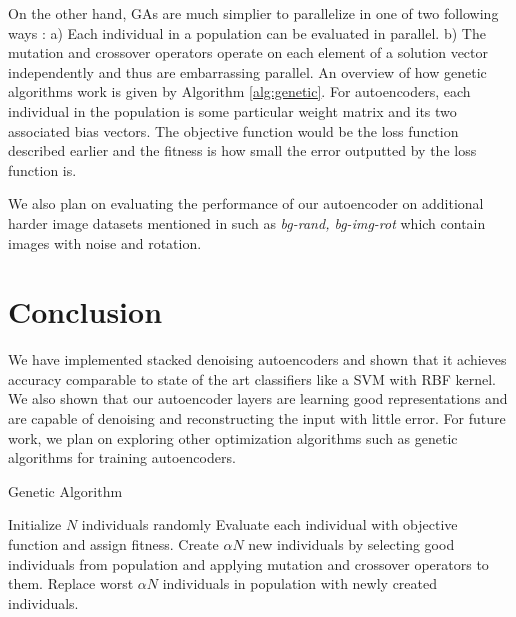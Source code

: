 \documentclass[conference]{IEEEtran}
\begin{document}
On the other hand, GAs are much simplier to parallelize in one of two following ways \cite{cantu1998survey}: a) Each individual in a population can be evaluated in parallel. b) The mutation and crossover operators operate on each element of a solution vector independently and thus are embarrassing parallel. An overview of how genetic algorithms work is given by Algorithm \ref{alg:genetic}. For autoencoders, each individual in the population is some particular weight matrix and its two associated bias vectors. The objective function would be the loss function described earlier and the fitness is how small the error outputted by the loss function is. 

We also plan on evaluating the performance of our autoencoder on additional harder image datasets mentioned in \cite{vincent2010stacked} such as \textit{bg-rand, bg-img-rot} which contain images with noise and rotation. 

\section{Conclusion}
We have implemented stacked denoising autoencoders and shown that it achieves accuracy comparable to state of the art classifiers like a SVM with RBF kernel. We also shown that our autoencoder layers are learning good representations and are capable of denoising and reconstructing the input with little error. For future work, we plan on exploring other optimization algorithms such as genetic algorithms for training autoencoders. 

\begin{algorithm}[h]
\caption{Genetic Algorithm}
\label{alg:genetic}
\begin{algorithmic}
\STATE Initialize $N$ individuals randomly
	\STATE Evaluate each individual with objective function and assign fitness.
	\STATE Create $\alpha N$ new individuals by selecting good individuals from population and applying mutation and crossover operators to them.
	\STATE Replace worst $\alpha N$ individuals in population with newly created individuals.
\ENDFOR
\end{algorithmic}
\end{algorithm}



\end{document}
